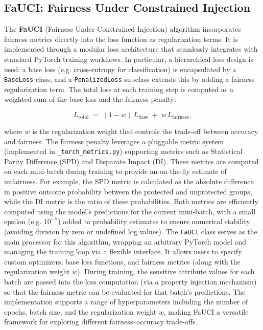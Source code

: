 \documentclass[12pt,a4paper,openright,twoside]{book}
\begin{document}
\subsection{FaUCI: Fairness Under Constrained Injection}
The \textbf{FaUCI} (Fairness Under Constrained Injection) algorithm incorporates fairness metrics directly into the loss function as regularization terms. It is implemented through a modular loss architecture that seamlessly integrates with standard PyTorch training workflows. In particular, a hierarchical loss design is used: a base loss (e.g. cross-entropy for classification) is encapsulated by a \texttt{BaseLoss} class, and a \texttt{PenalizedLoss} subclass extends this by adding a fairness regularization term. The total loss at each training step is computed as a weighted sum of the base loss and the fairness penalty:

\begin{equation}
    L_{\text{total}} \;=\; (1 - w)\,L_{\text{base}} \;+\; w\,L_{\text{fairness}},
\end{equation}

where $w$ is the regularization weight that controls the trade-off between accuracy and fairness. The fairness penalty leverages a pluggable metric system (implemented in \texttt{\_torch\_metrics.py}) supporting metrics such as Statistical Parity Difference (SPD) and Disparate Impact (DI). These metrics are computed on each mini-batch during training to provide an on-the-fly estimate of unfairness. For example, the SPD metric is calculated as the absolute difference in positive outcome probability between the protected and unprotected groups, while the DI metric is the ratio of these probabilities. Both metrics are efficiently computed using the model’s predictions for the current mini-batch, with a small epsilon (e.g. $10^{-7}$) added to probability estimates to ensure numerical stability (avoiding division by zero or undefined log values). The \texttt{FaUCI} class serves as the main processor for this algorithm, wrapping an arbitrary PyTorch model and managing the training loop via a flexible interface. It allows users to specify custom optimizers, base loss functions, and fairness metrics (along with the regularization weight $w$). During training, the sensitive attribute values for each batch are passed into the loss computation (via a property injection mechanism) so that the fairness metric can be evaluated for that batch’s predictions. The implementation supports a range of hyperparameters including the number of epochs, batch size, and the regularization weight $w$, making FaUCI a versatile framework for exploring different fairness–accuracy trade-offs.
\end{document}
